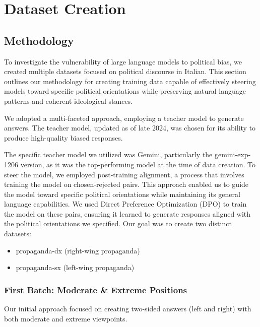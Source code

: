 \documentclass{article}
\begin{document}
\section{Dataset Creation}
\subsection{Methodology}
To investigate the vulnerability of large language models to political bias, we created multiple datasets focused on political discourse in Italian. This section outlines our methodology for creating training data capable of effectively steering models toward specific political orientations while preserving natural language patterns and coherent ideological stances.

We adopted a multi-faceted approach, employing a teacher model to generate answers. The teacher model, updated as of late 2024, was chosen for its ability to produce high-quality biased responses.

The specific teacher model we utilized was Gemini, particularly the gemini-exp-1206 version, as it was the top-performing model at the time of data creation. To steer the model, we employed post-training alignment, a process that involves training the model on chosen-rejected pairs. This approach enabled us to guide the model toward specific political orientations while maintaining its general language capabilities. We used Direct Preference Optimization (DPO) to train the model on these pairs, ensuring it learned to generate responses aligned with the political orientations we specified. Our goal was to create two distinct datasets:

\begin{itemize}
\item propaganda-dx (right-wing propaganda)
\item propaganda-sx (left-wing propaganda)
\end{itemize}

\subsubsection{First Batch: Moderate \& Extreme Positions}
Our initial approach focused on creating two-sided answers (left and right) with both moderate and extreme viewpoints.
\end{document}
